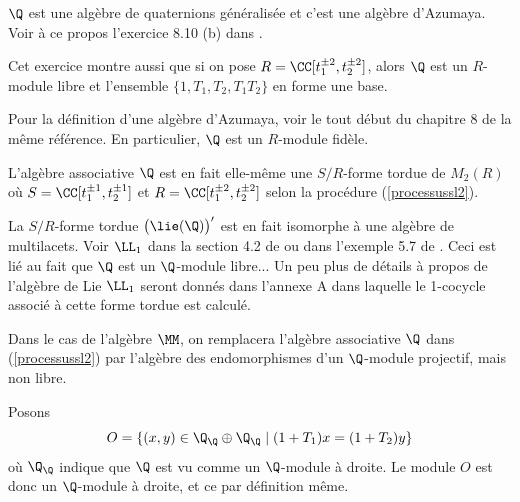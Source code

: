 \begin{Rem} \label{quaterniongen} $\Q$ est une algèbre de quaternions généralisée et c'est une algèbre d'Azumaya. Voir à ce propos l'exercice 8.10 (b) dans \cite{FDnoncom}.

Cet exercice montre aussi que si on pose $R = \CC[t_1^{\pm 2},t_2^{\pm 2}]$, alors $\Q$ est un $R$-module libre et l'ensemble $\{1,T_1,T_2,T_1T_2\}$ en forme une base.

Pour la définition d'une algèbre d'Azumaya, voir le tout début du chapitre 8 de la même référence. En particulier, $\Q$ est un $R$-module fidèle.
%
\end{Rem}

\begin{Rem} \label{cocyclequaternion} L'algèbre associative $\Q$ est en fait elle-même une $S/R$-forme tordue de $M_2(R)$ où $S = \CC[t_1^{\pm 1},t_2^{\pm 1}]$ et $R = \CC[t_1^{\pm 2},t_2^{\pm 2}]$ selon la procédure (\ref{processussl2}). 

La $S/R$-forme tordue $\big(\lie(\Q)\big)'$ est en fait isomorphe à une algèbre de multilacets. Voir $\LL_1$ dans la section 4.2 de \cite{LPtfa} ou dans l'exemple 5.7 de \cite{GPmar}. Ceci est lié au fait que $\Q$ est un $\Q$-module libre... Un peu plus de détails à propos de l'algèbre de Lie $\LL_1$ seront donnés dans l'annexe A dans laquelle le 1-cocycle associé à cette forme tordue est calculé.  
\end{Rem}

Dans le cas de l'algèbre $\MM$, on remplacera l'algèbre associative $\Q$ dans (\ref{processussl2}) par l'algèbre des endomorphismes d'un $\Q$-module projectif, mais non libre. 
 
Posons
\begin{equation} \label{modulemargaux}
O = \{(x,y) \in \Q_\Q \oplus \Q_\Q \; | \; (1+T_1)x = (1+T_2)y\}
\end{equation} 
où $\Q_\Q$ indique que $\Q$ est vu comme un $\Q$-module à droite. Le module $O$ est donc un $\Q$-module à droite, et ce par définition même.

